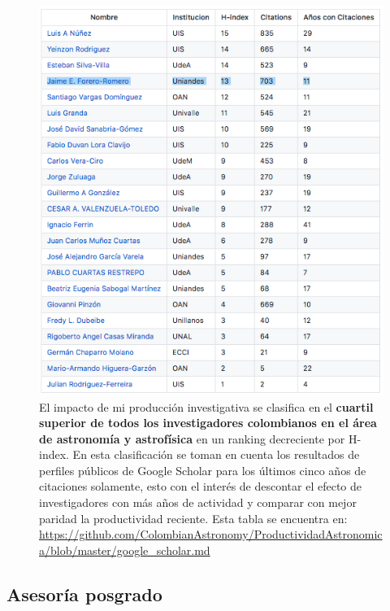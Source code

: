 \documentclass{article}
\begin{document}
\begin{figure}[!h]
\begin{center}
\includegraphics[scale=0.5]{scholar_astronomia.png}
\caption{
El impacto de mi producci\'on investigativa se clasifica en el {\bf cuartil
  superior de todos los investigadores colombianos en el \'area de
  astronom\'ia y astrof\'isica} en 
  un ranking decreciente por H-index. 
  En esta clasificaci\'on se toman en cuenta los resultados de
  perfiles p\'ublicos de Google Scholar
  para los \'ultimos cinco a\~nos de citaciones solamente, esto con el
  inter\'es de descontar el efecto de investigadores con m\'as a\~nos de
  actividad y comparar con mejor paridad la productividad
  reciente. 
Esta tabla se encuentra en: 
\url{https://github.com/ColombianAstronomy/ProductividadAstronomica/blob/master/google_scholar.md}
\label{table:astro}}
\end{center}
\end{figure}

\newpage

\subsection{Asesor\'ia posgrado}
\end{document}
